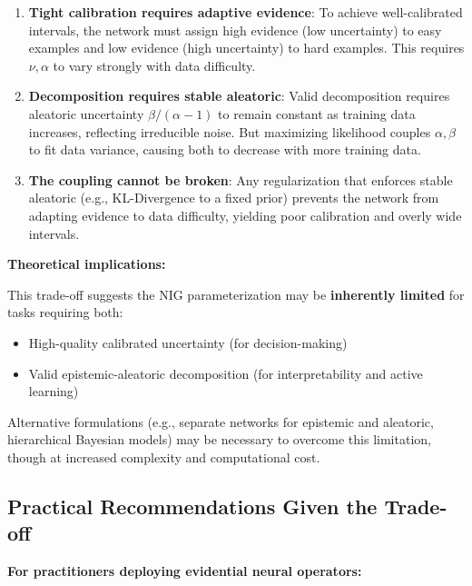 \begin{enumerate}
\item \textbf{Tight calibration requires adaptive evidence}: To achieve well-calibrated intervals, the network must assign high evidence (low uncertainty) to easy examples and low evidence (high uncertainty) to hard examples. This requires $\nu, \alpha$ to vary strongly with data difficulty.

\item \textbf{Decomposition requires stable aleatoric}: Valid decomposition requires aleatoric uncertainty $\beta/(\alpha-1)$ to remain constant as training data increases, reflecting irreducible noise. But maximizing likelihood couples $\alpha, \beta$ to fit data variance, causing both to decrease with more training data.

\item \textbf{The coupling cannot be broken}: Any regularization that enforces stable aleatoric (e.g., KL-Divergence to a fixed prior) prevents the network from adapting evidence to data difficulty, yielding poor calibration and overly wide intervals.
\end{enumerate}

\textbf{Theoretical implications:}

This trade-off suggests the NIG parameterization may be \textbf{inherently limited} for tasks requiring both:
\begin{itemize}
\item High-quality calibrated uncertainty (for decision-making)
\item Valid epistemic-aleatoric decomposition (for interpretability and active learning)
\end{itemize}

Alternative formulations (e.g., separate networks for epistemic and aleatoric, hierarchical Bayesian models) may be necessary to overcome this limitation, though at increased complexity and computational cost.

\subsection{Practical Recommendations Given the Trade-off}

\textbf{For practitioners deploying evidential neural operators:}

